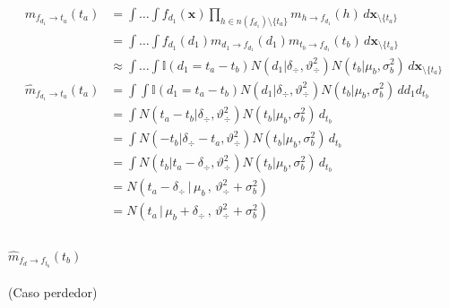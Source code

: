 \documentclass[11pt,twoside, spanish]{report} %
\begin{document}
\begin{equation}\label{eq:^m_fd_ta}
	\begin{split}
		m_{f_{d_1} \rightarrow t_a}(t_a) &= \int \dots \int f_{d_1}(\textbf{x}) \prod_{h \in n(f_{d_1}) \setminus \{t_a\} } m_{h \rightarrow f_{d_1}}(h) \, d\textbf{x}_{\setminus \{t_a\} }  \\
		&= \int \dots \int f_{d_1}(d_1)m_{d_1 \rightarrow f_{d_1}}(d_1) m_{t_b \rightarrow f_{d_1}}(t_b)  \, d\textbf{x}_{\setminus \{t_a\} }  \\
		&\approx  \int \dots \int \mathbb{I}(d_1 = t_a - t_b) N(d_1 | \delta_{\div}, \vartheta_{\div}^2) N(t_b | \mu_b , \sigma_b^2 )  \, d\textbf{x}_{\setminus \{t_a\} } \\[0.1cm]
		\widehat{m}_{f_{d_1} \rightarrow t_a}(t_a)  & = \int \int \mathbb{I}(d_1 = t_a - t_b) N(d_1 | \delta_{\div}, \vartheta_{\div}^2) N(t_b | \mu_b , \sigma_b^2 )  \, d{d_1} d_{t_b} \\
		& = \int  N(t_a - t_b | \delta_{\div}, \vartheta_{\div}^2) N(t_b | \mu_b , \sigma_b^2 )  \, d_{t_b} \\
		&=\int  N( - t_b | \delta_{\div} - t_a, \vartheta_{\div}^2) N(t_b | \mu_b , \sigma_b^2 )  \, d_{t_b} \\
		& = \int  N( t_b | t_a - \delta_{\div}, \vartheta_{\div}^2) N(t_b | \mu_b , \sigma_b^2 )  \,  d_{t_b} \\
		&=N(t_a - \delta_{\div} \, | \, \mu_b \, , \, \vartheta_{\div}^2 + \sigma_b^2) \\
		&= N(t_a \, | \, \mu_b + \delta_{\div} \, , \, \vartheta_{\div}^2 + \sigma_b^2) \\
	\end{split}
\end{equation}


\paragraph{$\widehat{m}_{f_d \rightarrow f_{t_b}}(t_b)$} (Caso perdedor)
\end{document}
